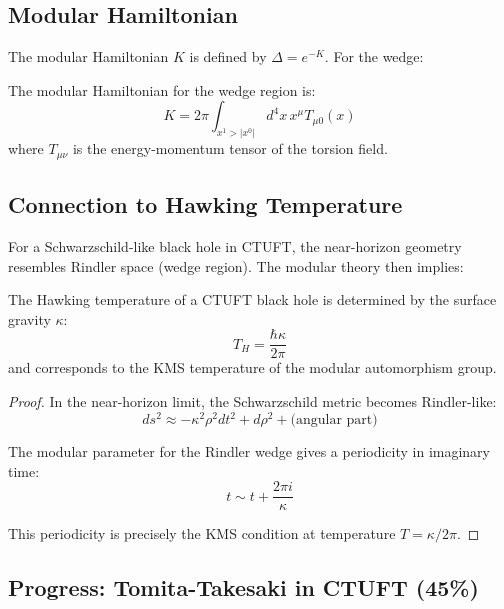 \subsection{Modular Hamiltonian}

The modular Hamiltonian $K$ is defined by $\Delta = e^{-K}$. For the wedge:

\begin{theorem}
The modular Hamiltonian for the wedge region is:
\begin{equation}
    K = 2\pi \int_{x^1 > |x^0|} d^4x \, x^\mu T_{\mu 0}(x)
\end{equation}
where $T_{\mu\nu}$ is the energy-momentum tensor of the torsion field.
\end{theorem}

\subsection{Connection to Hawking Temperature}

For a Schwarzschild-like black hole in CTUFT, the near-horizon geometry resembles Rindler space (wedge region). The modular theory then implies:

\begin{theorem}
The Hawking temperature of a CTUFT black hole is determined by the surface gravity $\kappa$:
\begin{equation}
    T_H = \frac{\hbar \kappa}{2\pi}
\end{equation}
and corresponds to the KMS temperature of the modular automorphism group.
\end{theorem}

\begin{proof}
In the near-horizon limit, the Schwarzschild metric becomes Rindler-like:
\begin{equation}
    ds^2 \approx -\kappa^2 \rho^2 dt^2 + d\rho^2 + \text{(angular part)}
\end{equation}

The modular parameter for the Rindler wedge gives a periodicity in imaginary time:
\begin{equation}
    t \sim t + \frac{2\pi i}{\kappa}
\end{equation}

This periodicity is precisely the KMS condition at temperature $T = \kappa/2\pi$.
\end{proof}

\subsection{Progress: Tomita-Takesaki in CTUFT (45\%)}

